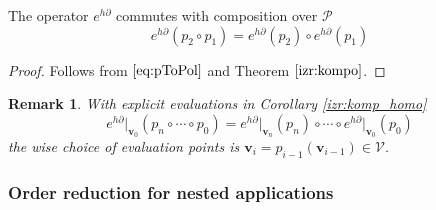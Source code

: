 \documentclass[smallcondensed]{svjour3}
\newcommand{\VV}{\mathcal{V}}
\newcommand{\vv}{\mathbf{v}}
\newcommand{\dP}{\mathcal{P}}
\newcommand{\D}{\partial}
\newtheorem{opomba}{Remark}[section]
\begin{document}
   \begin{corollary}\label{izr:komp_homo}
   The operator $e^{h\D}$ commutes with composition over $\dP$
   \begin{equation}
   e^{h\D}(p_2\circ p_1)=e^{h\D}(p_2)\circ e^{h\D}(p_1)
   \end{equation}
   \end{corollary}
   
   \begin{proof}
   Follows from $\eqref{eq:pToPol}$ and Theorem $\ref{izr:kompo}$.
   \end{proof}
   
   \begin{opomba}
   With explicit evaluations in Corollary \ref{izr:komp_homo}
   \begin{equation}
   e^{h\D}\vert_{\vv_0}(p_n\circ\cdots\circ p_0)=e^{h\D}\vert_{\vv_n}(p_n)\circ\cdots\circ e^{h\D}\vert_{\vv_0}(p_0)
   \end{equation}
   the wise choice of evaluation points is $\vv_{i}=p_{i-1}(\vv_{i-1})\in \VV$.
   \end{opomba}
 
 \subsubsection{Order reduction for nested applications}\label{sec:orderReduction}
 
\end{document}
